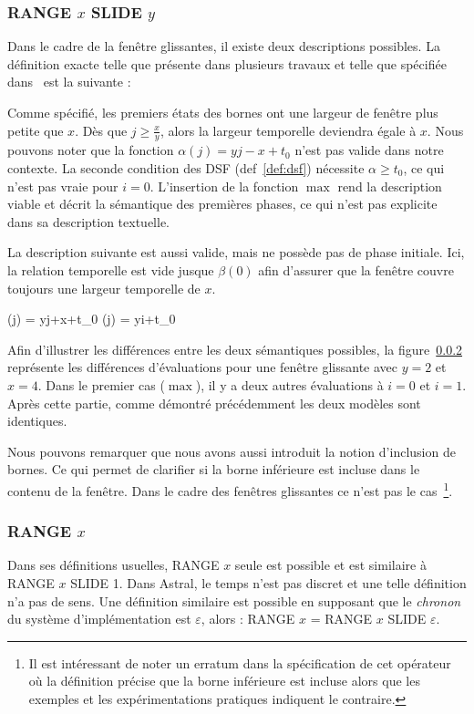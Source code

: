 \subsubsection{RANGE $x$ SLIDE $y$}
Dans le cadre de la fenêtre glissantes, il existe deux descriptions possibles. La définition exacte telle que présente dans plusieurs travaux et telle que spécifiée dans~\cite{Jain:spread} est la suivante :


Comme spécifié, les premiers états des bornes ont une largeur de fenêtre plus petite que $x$. Dès que $j \geq \frac xy$, alors la largeur temporelle deviendra égale à $x$. Nous pouvons noter que la fonction $\alpha(j) = yj-x+t_0$ n'est pas valide dans notre contexte. La seconde condition des DSF (def~\ref{def:dsf}) nécessite $\alpha \geq t_0$, ce qui n'est pas vraie pour $i=0$. L'insertion de la fonction $\max$ rend la description viable et décrit la sémantique des premières phases, ce qui n'est pas explicite dans sa description textuelle.

La description suivante est aussi valide, mais ne possède pas de phase initiale. Ici, la relation temporelle est vide jusque $\beta(0)$ afin d'assurer que la fenêtre couvre toujours une largeur temporelle de $x$.

	{\beta(j) = yj+x+t_0}
	{\alpha(j) = yi+t_0}

Afin d'illustrer les différences entre les deux sémantiques possibles, la figure~\ref{} représente les différences d'évaluations pour une fenêtre glissante avec $y=2$ et $x=4$. Dans le premier cas ($\max$), il y a deux autres évaluations à $i=0$ et $i=1$. Après cette partie, comme démontré précédemment les deux modèles sont identiques.

Nous pouvons remarquer que nous avons aussi introduit la notion d'inclusion de bornes. Ce qui permet de clarifier si la borne inférieure est incluse dans le contenu de la fenêtre. Dans le cadre des fenêtres glissantes ce n'est pas le cas~\footnote{Il est intéressant de noter un erratum dans la spécification de cet opérateur où la définition précise que la borne inférieure est incluse alors que les exemples et les expérimentations pratiques indiquent le contraire.}.

\subsubsection{RANGE $x$}
Dans ses définitions usuelles, RANGE $x$ seule est possible et est similaire à RANGE $x$ SLIDE 1. Dans Astral, le temps n'est pas discret et une telle définition n'a pas de sens. Une définition similaire est possible en supposant que le \textit{chronon} du système d'implémentation est $\varepsilon$, alors : RANGE $x$ = RANGE $x$ SLIDE $\varepsilon$.

